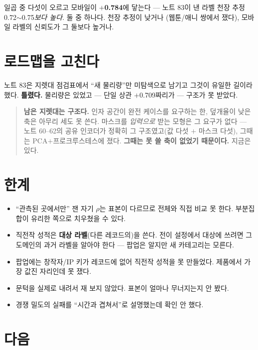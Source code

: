 \documentclass[10pt]{article}
\begin{document}
일곱 중 다섯이 오르고 모바일이 \textbf{$+$0.784}에 닿는다 --- 노트 83이 낸
라벨 천장 추정 0.72$\sim$0.75\emph{보다 높다}. 둘 중 하나다. 천장 추정이 낮거나
(웹툰/애니 쌍에서 쟀다), 모바일 라벨의 신뢰도가 그 둘보다 높거나.

\section{로드맵을 고친다}

노트 83은 지렛대 점검표에서 ``새 물리량''만 미탐색으로 남기고 그것이 유일한
길이라 했다. \textbf{틀렸다.} 물리량은 있었고 --- 단일 상관 $+$0.709짜리가 ---
구조가 못 받았다.

\begin{quote}\fontsize{9.5}{11.5}\selectfont
\textbf{남은 지렛대는 구조다.} 인자 공간이 완전 케이스를 요구하는 한, 덮개율이
낮은 축은 아무리 세도 못 쓴다. 마스크를 \emph{입력으로} 받는 모형은 그 요구가
없다 --- 노트 60--62의 공유 인코더가 정확히 그 구조였고(값 다섯 $+$ 마스크
다섯), 그때는 PCA$+$프로크루스테스에 졌다. \textbf{그때는 못 쓸 축이 없었기
때문이다.} 지금은 있다.
\end{quote}

\section{한계}

\begin{itemize}[leftmargin=1.1em,itemsep=0.15em]
\item ``관측된 곳에서만'' 잰 자기 $\rho$는 표본이 다르므로 전체와 직접 비교
      못 한다. 부분집합이 유리한 쪽으로 치우쳤을 수 있다.
\item 직전작 성적은 \textbf{대상 라벨}(다른 레코드의)을 쓴다. 전이 설정에서
      대상에 쓰려면 그 도메인의 과거 라벨을 알아야 한다 --- 팝업은 알지만
      새 카테고리는 모른다.
\item 팝업에는 창작자/IP 키가 레코드에 없어 직전작 성적을 못 만들었다.
      제품에서 가장 값진 자리인데 못 쟀다.
\item 문턱을 실제로 내려서 재 보지 않았다. 표본이 얼마나 무너지는지 안 봤다.
\item 경쟁 밀도의 실패를 ``시간과 겹쳐서''로 설명했는데 확인 안 했다.
\end{itemize}

\section{다음}
\end{document}
